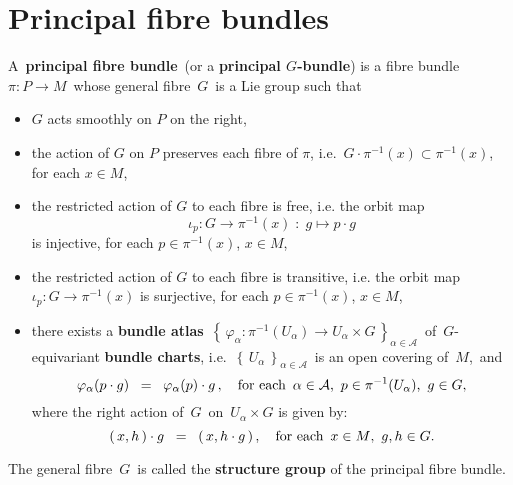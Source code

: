

\section{Principal fibre bundles}
\setcounter{theorem}{0}
\setcounter{equation}{0}


\renewcommand{\theenumi}{\roman{enumi}}
\renewcommand{\labelenumi}{\textnormal{(\theenumi)}$\;\;$}


\begin{definition}
\mbox{}
\vskip 0.2cm
\noindent
A \,\textbf{principal fibre bundle}\, (or a \textbf{principal $G$-bundle})
is a fibre bundle \,$\pi : P \longrightarrow M$\,
whose general fibre \,$G$\, is a Lie group such that
\begin{itemize}
\item
	$G$ acts smoothly on $P$ {\color{red}on the right},
\item
	the action of $G$ on $P$ preserves each fibre of $\pi$, i.e. \,$G\cdot\pi^{-1}(x) \subset \pi^{-1}(x)$,\,
	for each $x \in M$,
\item
	the restricted action of $G$ to each fibre is free, i.e.
	the orbit map
	\begin{equation*}
	\iota_{p} : G \longrightarrow \pi^{-1}(x) \; : \; g \longmapsto p \cdot g
	\end{equation*}
	is injective,
	for each $p \in \pi^{-1}(x)$, $x \in M$,
\item
	the restricted action of $G$ to each fibre is transitive, i.e.
	the orbit map $\iota_{p} : G \longrightarrow \pi^{-1}(x)$ is surjective,
	for each $p \in \pi^{-1}(x)$, $x \in M$,
\item
	there exists a \textbf{bundle atlas}
	\,$\left\{\,\varphi_{\alpha} : \pi^{-1}(U_{\alpha}) \longrightarrow U_{\alpha} \times G\,\right\}_{\alpha\in\mathcal{A}}$\,
	of \,{\color{red}$G$-equivariant \textbf{bundle charts}}, i.e.
	\,$\left\{\,U_{\alpha}\,\right\}_{\alpha\in\mathcal{A}}$\,
	is an open covering of \,$M$,\, and
	\begin{equation*}
	\varphi_{\alpha}(p \cdot g) \;\; = \;\; \varphi_{\alpha}(p) \cdot g\,,
	\quad
	\textnormal{for each \,$\alpha \in \mathcal{A}$, \,$p \in \pi^{-1}(U_{\alpha})$, \,$g \in G$},
	\end{equation*}
	where the right action of \,$G$\, on \,$U_{\alpha} \times G$ is given by:
	\begin{equation*}
	(\,x,h\,) \cdot g \;\; = \;\; (\,x,h \cdot g\,)\,,
	\quad
	\textnormal{for each \,$x \in M$, \,$g,h \in G$}.
	\end{equation*}
\end{itemize}
The general fibre \,$G$\, is called the \textbf{structure group} of the principal fibre bundle.
\end{definition}

